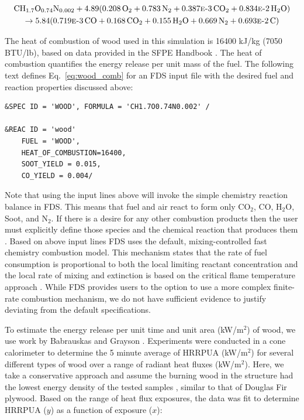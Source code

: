 \documentclass[11pt,oneside]{book}
\renewcommand{\C}{\mbox{C}}
\renewcommand{\H}{\mbox{H}}
\renewcommand{\O}{\mbox{O}}
\newcommand{\N}{\mbox{N}}
\begin{document}
\begin{multline}
\C\H_{1.7}\O_{0.74}\N_{0.002} + 4.89(0.208\,\O_{2} + 0.783\,\N_{2} + 0.387\text{\sc{e}-}3\,\C\O_{2} + 0.834\text{\sc{e}-}2\,\H_{2}\O) \\ 
\rightarrow 5.84(0.719\text{\sc{e}-}3\,\C\O + 0.168\,\C\O_{2} + 0.155\,\H_{2}\O + 0.669\,\N_{2} + 0.693\text{\sc{e}-}2\,\C)
\label{eq:wood_comb}
\end{multline}

The heat of combustion of wood used in this simulation is 16400 kJ/kg (7050 BTU/lb), based on data provided in the SFPE Handbook \cite{SFPE:Tewarson}. The heat of combustion quantifies the energy release per unit mass of the fuel. The following text defines Eq.~\ref{eq:wood_comb} for an FDS input file with the desired fuel and reaction properties discussed above:

\begin{lstlisting}
&SPEC ID = 'WOOD', FORMULA = 'CH1.7O0.74N0.002' /

&REAC ID = 'wood' 
    FUEL = 'WOOD', 
    HEAT_OF_COMBUSTION=16400,
    SOOT_YIELD = 0.015,
    CO_YIELD = 0.004/
\end{lstlisting}

Note that using the input lines above will invoke the simple chemistry reaction balance in FDS. This means that fuel and air react to form only CO$_2$, CO, H$_2$O, Soot, and N$_2$. If there is a desire for any other combustion products then the user must explicitly define those species and the chemical reaction that produces them \cite{FDS_Users_Guide}. Based on above input lines FDS uses the default, mixing-controlled fast chemistry combustion model. This mechanism  states that the rate of fuel consumption is proportional to both the local limiting reactant concentration and the local rate of mixing and extinction is based on the critical flame temperature approach \cite{FDS_Math_Guide}. While FDS provides users to the option to use a more complex finite-rate combustion mechanism, we do not have sufficient evidence to justify deviating from the default specifications. 

To estimate the energy release per unit time and unit area (kW/m$^2$) of wood, we use work by Babrauskas and Grayson \cite{babrauskas1990}. Experiments were conducted in a cone calorimeter to determine the 5 minute average of HRRPUA (kW/m$^2$) for several different types of wood over a range of radiant heat fluxes (kW/m$^2$). Here, we take a conservative approach and assume the burning wood in the structure had the lowest energy density of the tested samples \cite{babrauskas1990}, similar to that of Douglas Fir plywood. Based on the range of heat flux exposures, the data was fit to determine HRRPUA ($y$) as a function of exposure ($x$):
\end{document}
